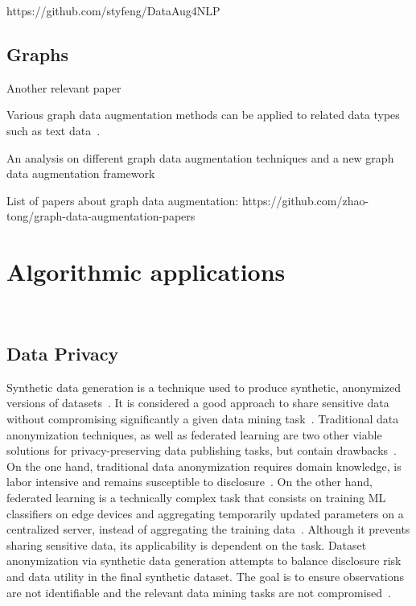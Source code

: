 \documentclass[parskip=full]{scrartcl}
\begin{document}
https://github.com/styfeng/DataAug4NLP

\subsection{Graphs}


Another relevant paper~\cite{zhou2020data}

Various graph data augmentation methods can be applied to related data types
such as text data~\cite{shorten2021text}.


An analysis on different graph data augmentation techniques and a new graph
data augmentation framework~\citet{zhao2021data}

List of papers about graph data augmentation:
https://github.com/zhao-tong/graph-data-augmentation-papers

\section{Algorithmic applications}~\label{sec:algorithmic-applications}

\subsection{Data Privacy}

Synthetic data generation is a technique used to produce synthetic, anonymized
versions of datasets~\cite{dankar2021fake}. It is considered a good approach
to share sensitive data without compromising significantly a given data mining
task~\cite{taub2018differential, park2018data}. Traditional data anonymization
techniques, as well as federated learning are two other viable solutions for
privacy-preserving data publishing tasks, but contain
drawbacks~\cite{hernandez2022synthetic}. On the one hand, traditional data
anonymization requires domain knowledge, is labor intensive and remains
susceptible to disclosure~\cite{reiter2004new}. On the other hand, federated
learning is a technically complex task that consists on training ML
classifiers on edge devices and aggregating temporarily updated parameters on
a centralized server, instead of aggregating the training
data~\cite{yu2022survey}. Although it prevents sharing sensitive data, its
applicability is dependent on the task. Dataset anonymization via synthetic
data generation attempts to balance disclosure risk and data utility in the
final synthetic dataset. The goal is to ensure observations are not
identifiable and the relevant data mining tasks are not
compromised~\cite{singh2017aggregating, li2018privacy}.
\end{document}
